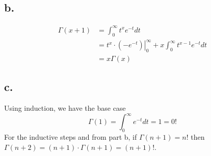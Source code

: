 \documentclass[11pt]{article}
\begin{document}
\subsection*{b.} 
\begin{equation*}
    \begin{aligned}
        \Gamma(x+1) &= \int_0^\infty t^xe^{-t} dt \\
        &= \left.t^x \cdot (-e^{-t}) \right|_0^\infty + x \int_0^\infty t^{x-1} e^{-t} dt \\
        &= x \Gamma(x)
    \end{aligned}
\end{equation*}
\subsection*{c.}
Using induction, we have the base case 
\[
    \Gamma(1) = \int_0^\infty e^{-t} dt = 1 = 0!
\]
For the inductive steps and from part b, if $\Gamma(n+1) = n!$ then $\Gamma(n+2) = (n+1) \cdot \Gamma(n+1) = (n+1)!$.
\end{document}
